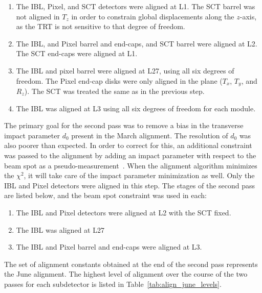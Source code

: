 \begin{enumerate}
\item The IBL, Pixel, and SCT detectors were aligned at L1.  The SCT barrel was not aligned in $T_z$ in order to constrain global displacements along the $z$-axis, as the TRT is not sensitive to that degree of freedom.
\item The IBL, and Pixel barrel and end-caps, and SCT barrel were aligned at L2.  The SCT end-caps were aligned at L1.
\item The IBL and pixel barrel were aligned at L27, using all six degrees of freedom.  The Pixel end-cap disks were only aligned in the plane ($T_x$, $T_y$, and $R_z$).  The SCT was treated the same as in the previous step.
\item The IBL was aligned at L3 using all six degrees of freedom for each module.
\end{enumerate}

The primary goal for the second pass was to remove a bias in the transverse impact parameter $d_0$ present in the March alignment. 
The resolution of $d_0$ was also poorer than expected.
In order to correct for this, an additional constraint was passed to the alignment by adding an impact parameter with respect to the beam spot as a pseudo-measurement~\cite{2014.alignment-framework}.
When the alignment algorithm minimizes the $\chi^2$, it will take care of the impact parameter minimization as well.
Only the IBL and Pixel detectors were aligned in this step.
The stages of the second pass are listed below, and the beam spot constraint was used in each:
\begin{enumerate}
\item The IBL and Pixel detectors were aligned at L2 with the SCT fixed.
\item The IBL was aligned at L27
\item The IBL and Pixel barrel and end-caps were aligned at L3.
\end{enumerate}
The set of alignment constants obtained at the end of the second pass represents the June alignment.
The highest level of alignment over the course of the two passes for each subdetector is listed in Table~\ref{tab:align_june_levels}.

